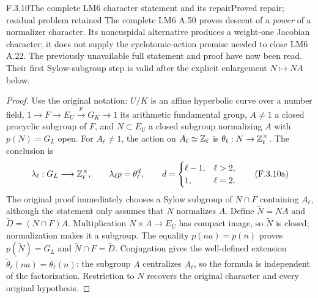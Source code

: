 \begin{result}{F.3.10}{The complete LM6 character statement and its repair}{Proved repair; residual problem retained}
The complete LM6 A.50 proves descent of a \emph{power} of a
normalizer character. Its noncuspidal alternative produces a
weight-one Jacobian character; it does not supply the
cyclotomic-action premise needed to close LM6 A.22. The
previously unavailable full statement and proof have now been
read. Their first Sylow-subgroup step is valid after the
explicit enlargement $N\mapsto NA$ below.
\end{result}
\begin{proof}
Use the original notation: $U/K$ is an affine hyperbolic curve
over a number field, $1\to F\to E_U\xrightarrow{p}G_K\to1$
its arithmetic fundamental group, $A\ne1$ a closed procyclic
subgroup of $F$, and $N\subset E_U$ a closed subgroup
normalizing $A$ with $p(N)=G_L$ open. For $A_\ell\ne1$,
the action on $A_\ell\simeq\mathbb Z_\ell$ is
$\theta_\ell:N\to\mathbb Z_\ell^\times$. The conclusion is
\[
 \lambda_\ell:G_L\longrightarrow\mathbb Z_\ell^\times,
 \qquad \lambda_\ell p=\theta_\ell^d,
 \qquad
 d=\begin{cases}\ell-1,&\ell>2,\\1,&\ell=2.\end{cases}
 \tag{F.3.10a}
\]
The original proof immediately chooses a Sylow subgroup of
$N\cap F$ containing $A_\ell$, although the statement only
assumes that $N$ normalizes $A$. Define
$\widetilde N=NA$ and $\widetilde D=(N\cap F)A$.
Multiplication $N\times A\to E_U$ has compact image, so
$\widetilde N$ is closed; normalization makes it a subgroup.
The equality $p(na)=p(n)$ proves
$p(\widetilde N)=G_L$ and
$\widetilde N\cap F=\widetilde D$. Conjugation gives the
well-defined extension
$\widetilde\theta_\ell(na)=\theta_\ell(n)$: the subgroup
$A$ centralizes $A_\ell$, so the formula is independent of
the factorization. Restriction to $N$ recovers the original
character and every original hypothesis.


\end{proof}
